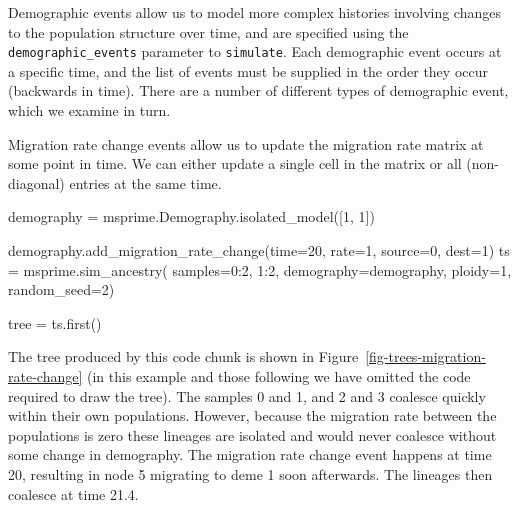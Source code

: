 \documentclass[graybox]{svmult}
\begin{document}
Demographic events allow us to model more complex histories involving
changes to the population structure over time, and are specified using
the \texttt{demographic\_events} parameter to \texttt{simulate}. Each
demographic event occurs at a specific time, and the list of events must
be supplied in the order they occur (backwards in time). There are a
number of different types of demographic event, which we examine in
turn.

\label{migration-rate-change}

Migration rate change events allow us to update the migration rate
matrix at some point in time. We can either update a single cell in the
matrix or all (non-diagonal) entries at the same time.
\begin{pythoncode}
demography = msprime.Demography.isolated_model([1, 1])

demography.add_migration_rate_change(time=20, rate=1, source=0, dest=1)
ts  = msprime.sim_ancestry(
    samples={0:2, 1:2},
    demography=demography,
    ploidy=1,
    random_seed=2)

tree = ts.first()

\end{pythoncode}

The tree produced by this code chunk is shown in
Figure~\ref{fig-trees-migration-rate-change} (in this example and those
following we have omitted the code required to draw the tree).
The samples 0 and 1, and 2 and 3 coalesce quickly within their
own populations. However, because the migration rate between the
populations is zero these lineages are isolated and would never coalesce
without some change in demography. The migration rate change event
happens at time 20, resulting in node 5 migrating to deme 1 soon
afterwards. The lineages then coalesce at time 21.4.
\end{document}

